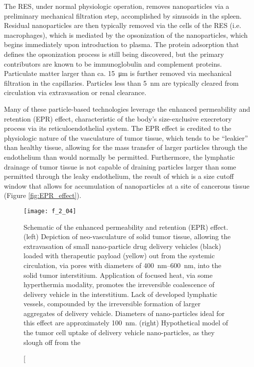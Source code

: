 \begin{refsection}
The RES, under normal physiologic operation, removes nanoparticles via
a preliminary mechanical filtration step, accomplished by sinusoids in the
spleen.\cite{Moghimi2001} Residual nanoparticles are then typically removed via
the cells of the RES (i.e. macrophages), which is mediated by the opsonization
of the nanoparticles, which begins immediately upon introduction to plasma. The
protein adsorption that defines the opsonization process is still being
discovered, but the primary contributors are known to be immunoglobulin and
complement proteins.\cite{Petros2010} Particulate matter larger than ca.
\SI{15}{\um} is further removed via mechanical filtration in the
capillaries.\cite{Ilium1982} Particles less than \SI{5}{\nm} are typically
cleared from circulation via extravasation or renal clearance.\cite{Choi2007}

Many of these particle-based technologies
leverage the enhanced permeability and retention (EPR) effect, characteristic of
the body's size-exclusive execretory process via its reticuloendothelial
system.\cite{Matsumura1986,Fang2010} The EPR effect is credited to the
physiologic nature of the vasculature of tumor tissue, which tends to be
``leakier'' than healthy tissue, allowing for the mass transfer of larger
particles through the endothelium than would normally be permitted. Furthermore,
the lymphatic drainage of tumor tissue is not capable of draining particles
larger than some permitted through the leaky endothelium, the result of which
is a size cutoff window that allows for accumulation of nanoparticles at a site
of cancerous tissue (Figure \ref{fig:EPR_effect}).
\begin{figure}[h!] \centering \texttt{[image: f\_2\_04]}
    \caption[Schematic of the enhanced permeability and retention (EPR) effect. (left)
Depiction of neo-vasculature of solid tumor tissue, allowing the extravasation
of small nano-particle drug delivery vehicles (black) loaded with therapeutic
payload (yellow) out from the systemic circulation, via pores with 
diameters of \SIrange{400}{600}{\nm}, into the solid tumor
interstitium. Application of focused heat, via some hyperthermia modality,
promotes the irreversible coalescence of delivery vehicle in the interstitium.
Lack of developed lymphatic vessels, compounded by the irreversible formation of
larger aggregates of delivery vehicle. Diameters of nano-particles ideal for
this effect are approximately \SI{100}{\nm}. (right) Hypothetical model of the tumor
cell uptake of delivery vehicle nano-particles, as they slough off from the

\end{figure}
\end{refsection}
